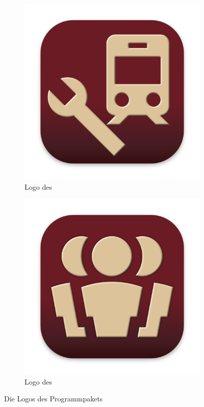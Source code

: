 \begin{figure}[h]
  \begin{subfigure}{0.3\textwidth}
    \includegraphics[width=\textwidth]{../../Icon/Einsatzplaner.png}
    \caption{Logo des \Einsatz}
  \end{subfigure}
  \begin{subfigure}{0.3\textwidth}
    \includegraphics[width=\textwidth]{../../Icon/Personalplaner.png}
    \caption{Logo des \Personal}
  \end{subfigure}
  \caption{Die Logos des Programmpakets}
\end{figure}


